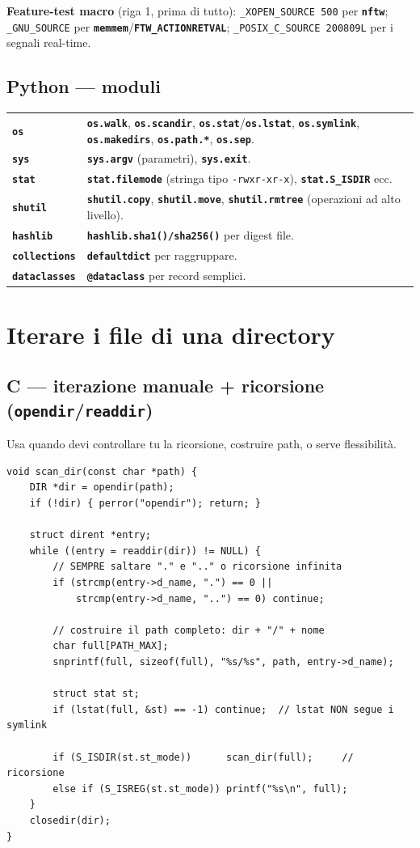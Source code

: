 \documentclass[10pt,a4paper]{article}
\newcommand{\fn}[1]{\texttt{\textbf{#1}}}
\begin{document}
\medskip
\textbf{Feature-test macro} (riga 1, prima di tutto): \verb|_XOPEN_SOURCE 500| per \fn{nftw}; \verb|_GNU_SOURCE| per \fn{memmem}/\fn{FTW\_ACTIONRETVAL}; \verb|_POSIX_C_SOURCE 200809L| per i segnali real-time.

\subsection{Python --- moduli}
\begin{tabular}{@{}p{3.2cm}p{13.5cm}@{}}
\fn{os} & \fn{os.walk}, \fn{os.scandir}, \fn{os.stat}/\fn{os.lstat}, \fn{os.symlink}, \fn{os.makedirs}, \fn{os.path.*}, \fn{os.sep}. \\
\fn{sys} & \fn{sys.argv} (parametri), \fn{sys.exit}. \\
\fn{stat} & \fn{stat.filemode} (stringa tipo \texttt{-rwxr-xr-x}), \fn{stat.S\_ISDIR} ecc. \\
\fn{shutil} & \fn{shutil.copy}, \fn{shutil.move}, \fn{shutil.rmtree} (operazioni ad alto livello). \\
\fn{hashlib} & \fn{hashlib.sha1()/sha256()} per digest file. \\
\fn{collections} & \fn{defaultdict} per raggruppare. \\
\fn{dataclasses} & \fn{@dataclass} per record semplici. \\
\end{tabular}

\section{Iterare i file di una directory}

\subsection{C --- iterazione manuale + ricorsione (\fn{opendir}/\fn{readdir})}
Usa quando devi controllare tu la ricorsione, costruire path, o serve flessibilità.
\begin{lstlisting}[style=c]
void scan_dir(const char *path) {
    DIR *dir = opendir(path);
    if (!dir) { perror("opendir"); return; }

    struct dirent *entry;
    while ((entry = readdir(dir)) != NULL) {
        // SEMPRE saltare "." e ".." o ricorsione infinita
        if (strcmp(entry->d_name, ".") == 0 ||
            strcmp(entry->d_name, "..") == 0) continue;

        // costruire il path completo: dir + "/" + nome
        char full[PATH_MAX];
        snprintf(full, sizeof(full), "%s/%s", path, entry->d_name);

        struct stat st;
        if (lstat(full, &st) == -1) continue;  // lstat NON segue i symlink

        if (S_ISDIR(st.st_mode))      scan_dir(full);     // ricorsione
        else if (S_ISREG(st.st_mode)) printf("%s\n", full);
    }
    closedir(dir);
}
\end{lstlisting}
\end{document}
